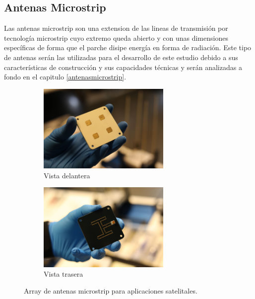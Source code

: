 \subsection{Antenas Microstrip}

\par Las antenas microstrip son una extension de las lineas de transmisión por tecnología microstrip cuyo extremo queda abierto y con unas dimensiones específicas de forma que el parche disipe energía en forma de radiación. Este tipo de antenas serán las utilizadas para el desarrollo de este estudio debido a sus características de construcción y sus capacidades técnicas y serán analizadas a fondo en el capitulo \ref{antenasmicrostrip}.
\vfill

\begin{figure}[h]
     \centering
     \begin{subfigure}[b]{\textwidth}
         \centering
         \includegraphics[width=0.7\textwidth]{archivos/enduro1}
         \caption{Vista delantera}
         \label{fig:endur1}
     \end{subfigure}
\vfill
     \begin{subfigure}[b]{\textwidth}
         \centering
         \includegraphics[width=0.7\textwidth]{archivos/enduro2}
         \caption{Vista trasera}
         \label{fig:endur2}
     \end{subfigure}

        \caption{Array de antenas microstrip para aplicaciones satelitales. \cite{Endurosat2018}}
        \label{fig:endur}
\end{figure}
\vfill
